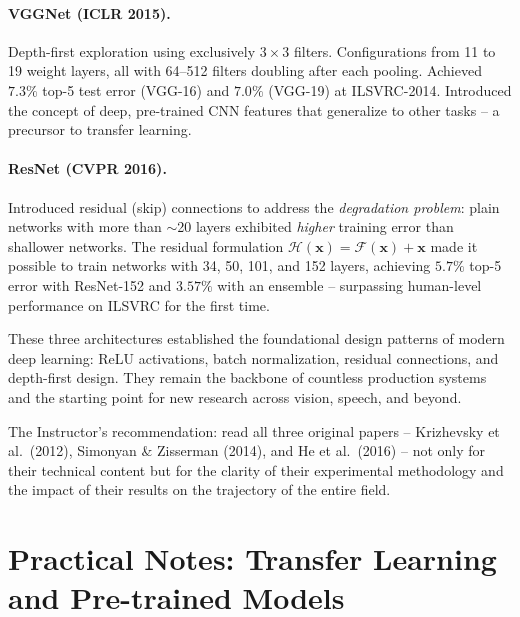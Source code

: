 \documentclass[12pt,a4paper]{article}
\begin{document}
\paragraph{VGGNet (ICLR 2015).}
Depth-first exploration using exclusively $3\times3$ filters. Configurations from 11 to 19 weight layers, all with 64--512 filters doubling after each pooling. Achieved $7.3\%$ top-5 test error (VGG-16) and $7.0\%$ (VGG-19) at ILSVRC-2014. Introduced the concept of deep, pre-trained CNN features that generalize to other tasks -- a precursor to transfer learning.

\paragraph{ResNet (CVPR 2016).}
Introduced residual (skip) connections to address the \emph{degradation problem}: plain networks with more than $\sim$20 layers exhibited \emph{higher} training error than shallower networks. The residual formulation $\mathcal{H}(\mathbf{x}) = \mathcal{F}(\mathbf{x}) + \mathbf{x}$ made it possible to train networks with 34, 50, 101, and 152 layers, achieving $5.7\%$ top-5 error with ResNet-152 and $3.57\%$ with an ensemble -- surpassing human-level performance on ILSVRC for the first time.

\medskip

These three architectures established the foundational design patterns of modern deep learning: ReLU activations, batch normalization, residual connections, and depth-first design. They remain the backbone of countless production systems and the starting point for new research across vision, speech, and beyond.

\begin{keyinsight}
The Instructor's recommendation: read all three original papers -- Krizhevsky et al.\ (2012), Simonyan \& Zisserman (2014), and He et al.\ (2016) -- not only for their technical content but for the clarity of their experimental methodology and the impact of their results on the trajectory of the entire field.
\end{keyinsight}

\section{Practical Notes: Transfer Learning and Pre-trained Models}
\label{sec:transfer}
\end{document}
